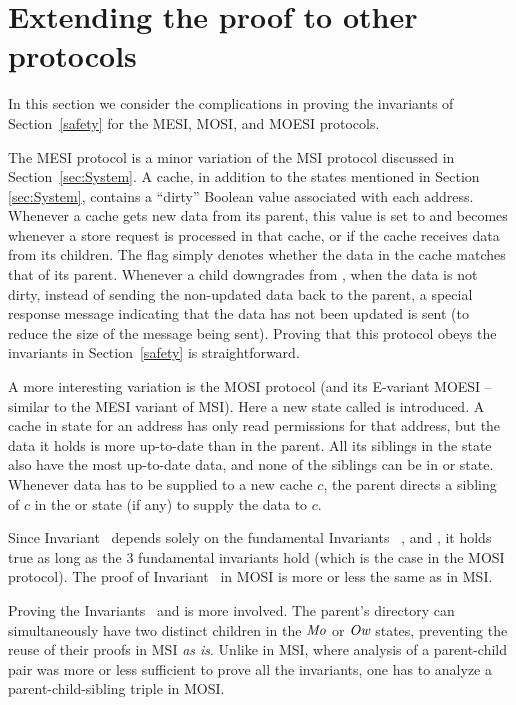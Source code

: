 \section{Extending the proof to other protocols}
\label{sec:Refinements}

In this section we consider the complications in proving the invariants
of Section~\ref{safety} for the MESI, MOSI, and MOESI protocols.

The MESI protocol is a minor variation of the MSI protocol discussed in Section~\ref{sec:System}.
A cache, in addition to the states mentioned in Section
\ref{sec:System}, contains a ``dirty'' Boolean value associated with each
address.  Whenever a cache gets new data from its parent, this value is set to
\False{} and becomes \True{} whenever a store request is processed in that
cache, or if the cache receives data from its children. The flag simply denotes
whether the data in the cache matches that of its parent.  Whenever a
child downgrades from \Mo{}, when the data is not dirty, instead of sending the
non-updated data back to the parent, a special response message indicating that
the data has not been updated is sent (to reduce the size of the message being
sent). Proving that this protocol obeys the invariants in Section~\ref{safety}
is straightforward.

A more interesting variation is the MOSI protocol (and its E-variant MOESI --
similar to the MESI variant of MSI). Here a new state called \Ow{} is
introduced. A cache in \Ow{} state for an address has only read permissions for
that address, but the data it holds is more up-to-date than in the parent.  All
its siblings in the \Sh{} state also have the most up-to-date data, and none of
the siblings can be in \Mo{} or \Ow{} state.  Whenever data has to be supplied
to a new cache $c$, the parent directs a sibling of $c$ in the \Ow{} or \Mo{}
state (if any) to supply the data to $c$.

Since Invariant~ depends solely on the fundamental Invariants~
,  and , it holds true
as long as the 3 fundamental invariants hold (which is the case in the MOSI
protocol). The proof of Invariant~ in MOSI is more
or less the same as in MSI.

Proving the Invariants~ and
 is more involved. The parent's directory can
simultaneously have two distinct children in the $\textit{Mo}$ or $\textit{Ow}$ states,
preventing the reuse of their proofs in MSI \emph{as is}. Unlike in MSI, where
analysis of a parent-child pair was more or less sufficient to prove all the
invariants, one has to analyze a parent-child-sibling triple in MOSI.
